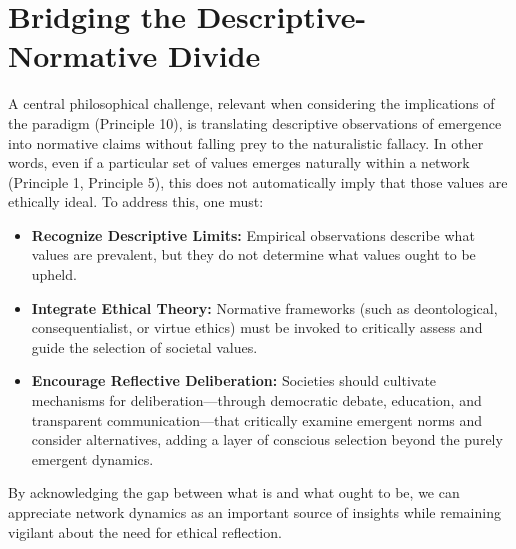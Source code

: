\documentclass[12pt,openany]{book}
\begin{document}
\section{Bridging the Descriptive-Normative Divide}
A central philosophical challenge, relevant when considering the implications of the paradigm (Principle 10), is translating descriptive observations of emergence into normative claims without falling prey to the naturalistic fallacy. In other words, even if a particular set of values emerges naturally within a network (Principle 1, Principle 5), this does not automatically imply that those values are ethically ideal. To address this, one must:
\begin{itemize}
    \item \textbf{Recognize Descriptive Limits:} Empirical observations describe what values are prevalent, but they do not determine what values ought to be upheld.
    \item \textbf{Integrate Ethical Theory:} Normative frameworks (such as deontological, consequentialist, or virtue ethics) must be invoked to critically assess and guide the selection of societal values.
    \item \textbf{Encourage Reflective Deliberation:} Societies should cultivate mechanisms for deliberation—through democratic debate, education, and transparent communication—that critically examine emergent norms and consider alternatives, adding a layer of conscious selection beyond the purely emergent dynamics.
\end{itemize}
By acknowledging the gap between what is and what ought to be, we can appreciate network dynamics as an important source of insights while remaining vigilant about the need for ethical reflection. %
\end{document}
